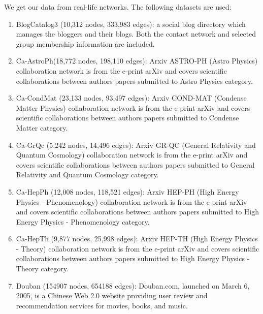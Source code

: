 We get our data from real-life networks\cite{datasets1}\cite{datasets2}. The following datasets are used:
\begin{enumerate}
	\item BlogCatalog3 (10,312 nodes, 333,983 edges): a social blog directory which manages the bloggers and their blogs. Both the contact network and selected group membership information are included.
	\item Ca-AstroPh(18,772 nodes, 198,110 edges): Arxiv ASTRO-PH (Astro Physics) collaboration network is from the e-print arXiv and covers scientific collaborations between authors papers submitted to Astro Physics category.
	\item Ca-CondMat (23,133 nodes, 93,497 edges): Arxiv COND-MAT (Condense Matter Physics) collaboration network is from the e-print arXiv and covers scientific collaborations between authors papers submitted to Condense Matter category.
	\item Ca-GrQc (5,242 nodes, 14,496 edges): Arxiv GR-QC (General Relativity and Quantum Cosmology) collaboration network is from the e-print arXiv and covers scientific collaborations between authors papers submitted to General Relativity and Quantum Cosmology category. 
	\item Ca-HepPh (12,008 nodes, 118,521 edges): Arxiv HEP-PH (High Energy Physics - Phenomenology) collaboration network is from the e-print arXiv and covers scientific collaborations between authors papers submitted to High Energy Physics - Phenomenology category.
	\item Ca-HepTh (9,877 nodes, 25,998 edges): Arxiv HEP-TH (High Energy Physics - Theory) collaboration network is from the e-print arXiv and covers scientific collaborations between authors papers submitted to High Energy Physics - Theory category. 
	\item Douban (154907 nodes, 654188 edges):
	 Douban.com, launched on March 6, 2005, is a Chinese Web 2.0 website providing user review and recommendation services for movies, books, and music.
\end{enumerate}
\clearpage
